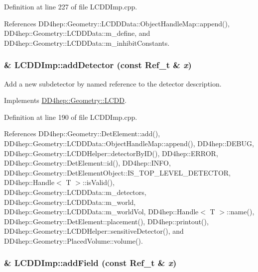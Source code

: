 Definition at line 227 of file LCDDImp.cpp.

References DD4hep::Geometry::LCDDData::ObjectHandleMap::append(), DD4hep::Geometry::LCDDData::m\_\-define, and DD4hep::Geometry::LCDDData::m\_\-inhibitConstants.\hypertarget{class_d_d4hep_1_1_geometry_1_1_l_c_d_d_imp_ad0926dfc64d99cddfdec4990829d3622}{
\subsubsection[{addDetector}]{ \& LCDDImp::addDetector (const {\bf Ref\_\-t} \& {\em x})}}
\label{class_d_d4hep_1_1_geometry_1_1_l_c_d_d_imp_ad0926dfc64d99cddfdec4990829d3622}


Add a new subdetector by named reference to the detector description. 

Implements \hyperlink{class_d_d4hep_1_1_geometry_1_1_l_c_d_d_a53a88518d0ab797a11bd61f9c567f7ac}{DD4hep::Geometry::LCDD}.

Definition at line 190 of file LCDDImp.cpp.

References DD4hep::Geometry::DetElement::add(), DD4hep::Geometry::LCDDData::ObjectHandleMap::append(), DD4hep::DEBUG, DD4hep::Geometry::LCDDHelper::detectorByID(), DD4hep::ERROR, DD4hep::Geometry::DetElement::id(), DD4hep::INFO, DD4hep::Geometry::DetElementObject::IS\_\-TOP\_\-LEVEL\_\-DETECTOR, DD4hep::Handle$<$ T $>$::isValid(), DD4hep::Geometry::LCDDData::m\_\-detectors, DD4hep::Geometry::LCDDData::m\_\-world, DD4hep::Geometry::LCDDData::m\_\-worldVol, DD4hep::Handle$<$ T $>$::name(), DD4hep::Geometry::DetElement::placement(), DD4hep::printout(), DD4hep::Geometry::LCDDHelper::sensitiveDetector(), and DD4hep::Geometry::PlacedVolume::volume().\hypertarget{class_d_d4hep_1_1_geometry_1_1_l_c_d_d_imp_a94f5aafcc5fc95d0b15feb960f244019}{
\subsubsection[{addField}]{ \& LCDDImp::addField (const {\bf Ref\_\-t} \& {\em x})}}
\label{class_d_d4hep_1_1_geometry_1_1_l_c_d_d_imp_a94f5aafcc5fc95d0b15feb960f244019}


